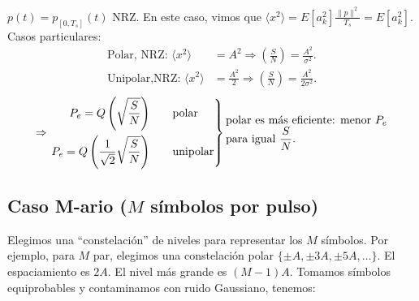 \begin{ejemplo}
    $p(t)= p_{[0,T_s]}(t)$ NRZ. En este caso, vimos que $\langle x^2 \rangle = E[a_k^2]\frac{\|p\|^2}{T_s} =
    E[a_k^2]$. Casos particulares:
    \begin{align*}
    \text{Polar, NRZ: } \langle x^2 \rangle  &= A^2 \Rightarrow \left(\frac{S}{N}\right) = \frac{A^2}{\sigma^2}.\\
    \text{Unipolar,NRZ: } \langle x^2 \rangle &=\frac{A^2}{2}\Rightarrow \left(\frac{S}{N}\right) =
    \frac{A^2}{2\sigma^2}.
\end{align*}
    \begin{equation*}
        \Rightarrow \left.\begin{aligned}
                        P_e = Q\left(\sqrt{\frac{S}{N}}\right)\qquad &\text{polar}\\
                        P_e = Q\left(\frac{1}{\sqrt{2}}\sqrt{\frac{S}{N}}\right)\qquad &\text{unipolar}
                    \end{aligned} \right\rbrace
                    \text{\begin{minipage}{5cm}
                            polar es más eficiente: menor $P_e$ para igual
                            $\frac{S}{N}$.
                          \end{minipage}}
    \end{equation*}
\end{ejemplo}

\subsection*{Caso M-ario ($M$ símbolos por pulso)}

Elegimos una ``constelación'' de niveles para representar los $M$ símbolos. Por ejemplo, para $M$ par, elegimos una constelación polar $\{\pm A, \pm 3A,\pm 5A,\ldots\}$. El espaciamiento es $2A$. El nivel más grande es $(M-1)A$. Tomamos símbolos equiprobables y contaminamos con ruido Gaussiano, tenemos:

\begin{figure}[htb]
    \centering\begin{minipage}{\textwidth}
    {}
    \endpgfgraphicnamed\end{minipage}
\end{figure}
\FloatBarrier

